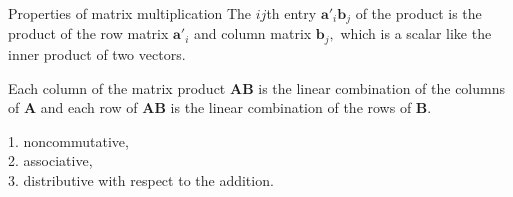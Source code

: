 \begin{frame}{Properties of matrix multiplication}
The $ij$th entry $\mathbf{a'}_i\mathbf{b}_j$ of the product  is the product of the row matrix
$\mathbf{a'}_i$ and column matrix $\mathbf{b}_j,$ which is a scalar like the inner product of two vectors.
\begin{theorem}
Each column of the matrix product $\mathbf{AB}$ is the linear combination of the columns of $\mathbf{A}$ and each row of $\mathbf{AB}$ is the linear combination of the rows of $\mathbf{B}.$
\end{theorem}
\begin{theorem}
1. noncommutative,\\
2. associative,\\
3. distributive with respect to the addition.
\end{theorem}
\end{frame}

